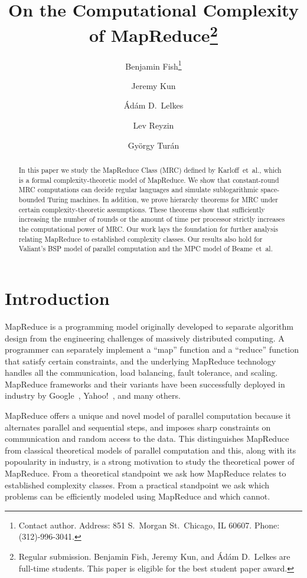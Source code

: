 \documentclass[11pt]{article}
\title{On the Computational Complexity of MapReduce\thanks{Regular submission. 
Benjamin Fish, Jeremy Kun, and \'Ad\'am D.\ Lelkes are full-time students. This paper is eligible for the best student paper award.}}
\date{}
\author{Benjamin Fish\thanks{Contact author. Address: 851 S.\ Morgan St.\ Chicago, IL 60607. Phone:  (312)-996-3041.}}
\author{Jeremy Kun}
\author{\'Ad\'am D.\ Lelkes}
\author{Lev Reyzin}
\author{Gy\"orgy Tur\'an}
\affil{
Department of Mathematics, Statistics, and Computer Science\\
University of Illinois at Chicago\\
Chicago, IL 60607\\
\texttt{\{bfish3,jkun2,alelke2,lreyzin,gyt\}@uic.edu}
}
\theoremstyle{definition}
\theoremstyle{remark}
\begin{document}
\maketitle

\begin{abstract} 

In this paper we study the MapReduce Class (MRC) defined by Karloff~et~al.,
which is a formal complexity-theoretic model of MapReduce. We show that
constant-round MRC computations can decide regular languages and simulate
sublogarithmic space-bounded Turing machines. In addition, we prove hierarchy
theorems for MRC under certain complexity-theoretic assumptions. These theorems
show that sufficiently increasing the number of rounds or the amount of time
per processor strictly increases the computational power of MRC. Our work lays
the foundation for further analysis relating MapReduce to established
complexity classes. Our results also hold for Valiant's BSP model of parallel
computation and the MPC model of Beame~et~al. 

\end{abstract}
\thispagestyle{empty}
\newpage
\setcounter{page}{1}
\section{Introduction}

MapReduce is a programming model originally developed to separate algorithm
design from the engineering challenges of massively distributed computing. A
programmer can separately implement a ``map'' function and a ``reduce''
function that satisfy certain constraints, and the underlying MapReduce
technology handles all the communication, load balancing, fault tolerance, and
scaling. MapReduce frameworks and their variants have been successfully
deployed in industry by Google~\cite{DeanG08}, Yahoo!~\cite{ShvachkoKRC10}, and
many others.

MapReduce offers a unique and novel model of parallel computation because it
alternates parallel and sequential steps, and imposes sharp constraints on
communication and random access to the data. This distinguishes MapReduce from
classical theoretical models of parallel computation and this, along with its
popoularity in industry, is a strong motivation to study the theoretical power
of MapReduce. From a theoretical standpoint we ask how MapReduce relates to
established complexity classes. From a practical standpoint we ask which
problems can be efficiently modeled using MapReduce and which cannot.
\end{document}
